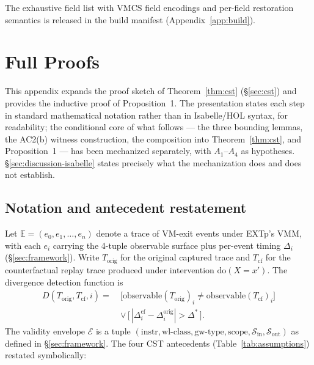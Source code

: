 \documentclass[conference]{IEEEtran}
\newcommand{\Korig}{T_\text{orig}}
\newcommand{\Tcf}{T_\text{cf}}
\newcommand{\Dstar}{\Delta^{*}}
\newcommand{\dox}[1]{\text{do}(X{=}#1)}
\begin{document}
The exhaustive field list with VMCS field encodings and per-field
restoration semantics is released in the build manifest
(Appendix~\ref{app:build}).

\section{Full Proofs}\label{app:proofs}

This appendix expands the proof sketch of
Theorem~\ref{thm:cst} (\S\ref{sec:cst}) and provides the inductive
proof of Proposition~1. The presentation states each step in
standard mathematical notation rather than in Isabelle/HOL syntax,
for readability; the conditional core of what follows --- the three
bounding lemmas, the AC2(b) witness construction, the composition
into Theorem~\ref{thm:cst}, and Proposition~1 --- has been
mechanized separately, with $A_1$--$A_4$ as hypotheses.
\S\ref{sec:discussion-isabelle} states precisely what the
mechanization does and does not establish.

\subsection{Notation and antecedent restatement}

Let $\mathbb{E} = (e_0, e_1, \ldots, e_n)$ denote a trace of
VM-exit events under EXTp's VMM, with each $e_i$ carrying the
4-tuple observable surface plus per-event timing $\Delta_i$
(\S\ref{sec:framework}). Write $\Korig$ for the original captured
trace and $\Tcf$ for the counterfactual replay trace produced
under intervention $\dox{x'}$. The divergence detection function
is
\begin{equation*}
\begin{aligned}
D(\Korig, \Tcf, i) =\ & \big[\text{observable}(\Korig)_i \neq \text{observable}(\Tcf)_i\big] \\
                      & \vee\,\big[\,|\Delta_i^{\text{cf}} - \Delta_i^{\text{orig}}| > \Dstar\,\big].
\end{aligned}
\end{equation*}
The validity envelope $\mathcal{E}$ is a tuple
$(\text{instr}, \text{wl-class}, \text{gw-type}, \text{scope},
\mathcal{S}_\text{in}, \mathcal{S}_\text{out})$ as defined in
\S\ref{sec:framework}. The four CST antecedents
(Table~\ref{tab:assumptions}) restated symbolically:
\end{document}
